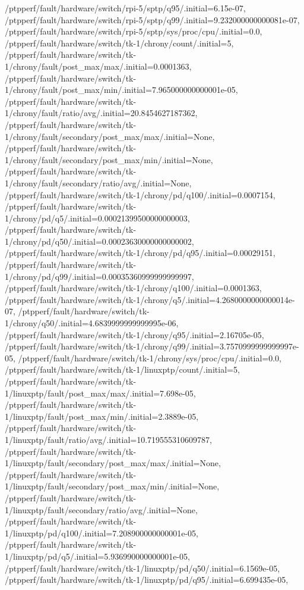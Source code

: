 {    /ptpperf/fault/hardware/switch/rpi-5/sptp/q95/.initial=6.15e-07,
    /ptpperf/fault/hardware/switch/rpi-5/sptp/q99/.initial=9.232000000000081e-07,
    /ptpperf/fault/hardware/switch/rpi-5/sptp/sys/proc/cpu/.initial=0.0,
    /ptpperf/fault/hardware/switch/tk-1/chrony/count/.initial=5,
    /ptpperf/fault/hardware/switch/tk-1/chrony/fault/post_max/max/.initial=0.0001363,
    /ptpperf/fault/hardware/switch/tk-1/chrony/fault/post_max/min/.initial=7.965000000000001e-05,
    /ptpperf/fault/hardware/switch/tk-1/chrony/fault/ratio/avg/.initial=20.8454627187362,
    /ptpperf/fault/hardware/switch/tk-1/chrony/fault/secondary/post_max/max/.initial=None,
    /ptpperf/fault/hardware/switch/tk-1/chrony/fault/secondary/post_max/min/.initial=None,
    /ptpperf/fault/hardware/switch/tk-1/chrony/fault/secondary/ratio/avg/.initial=None,
    /ptpperf/fault/hardware/switch/tk-1/chrony/pd/q100/.initial=0.0007154,
    /ptpperf/fault/hardware/switch/tk-1/chrony/pd/q5/.initial=0.00021399500000000003,
    /ptpperf/fault/hardware/switch/tk-1/chrony/pd/q50/.initial=0.00023630000000000002,
    /ptpperf/fault/hardware/switch/tk-1/chrony/pd/q95/.initial=0.00029151,
    /ptpperf/fault/hardware/switch/tk-1/chrony/pd/q99/.initial=0.00035360999999999997,
    /ptpperf/fault/hardware/switch/tk-1/chrony/q100/.initial=0.0001363,
    /ptpperf/fault/hardware/switch/tk-1/chrony/q5/.initial=4.2680000000000014e-07,
    /ptpperf/fault/hardware/switch/tk-1/chrony/q50/.initial=4.6839999999999995e-06,
    /ptpperf/fault/hardware/switch/tk-1/chrony/q95/.initial=2.16705e-05,
    /ptpperf/fault/hardware/switch/tk-1/chrony/q99/.initial=3.7570999999999997e-05,
    /ptpperf/fault/hardware/switch/tk-1/chrony/sys/proc/cpu/.initial=0.0,
    /ptpperf/fault/hardware/switch/tk-1/linuxptp/count/.initial=5,
    /ptpperf/fault/hardware/switch/tk-1/linuxptp/fault/post_max/max/.initial=7.698e-05,
    /ptpperf/fault/hardware/switch/tk-1/linuxptp/fault/post_max/min/.initial=2.3889e-05,
    /ptpperf/fault/hardware/switch/tk-1/linuxptp/fault/ratio/avg/.initial=10.719555310609787,
    /ptpperf/fault/hardware/switch/tk-1/linuxptp/fault/secondary/post_max/max/.initial=None,
    /ptpperf/fault/hardware/switch/tk-1/linuxptp/fault/secondary/post_max/min/.initial=None,
    /ptpperf/fault/hardware/switch/tk-1/linuxptp/fault/secondary/ratio/avg/.initial=None,
    /ptpperf/fault/hardware/switch/tk-1/linuxptp/pd/q100/.initial=7.208900000000001e-05,
    /ptpperf/fault/hardware/switch/tk-1/linuxptp/pd/q5/.initial=5.936990000000001e-05,
    /ptpperf/fault/hardware/switch/tk-1/linuxptp/pd/q50/.initial=6.1569e-05,
    /ptpperf/fault/hardware/switch/tk-1/linuxptp/pd/q95/.initial=6.699435e-05,
}
